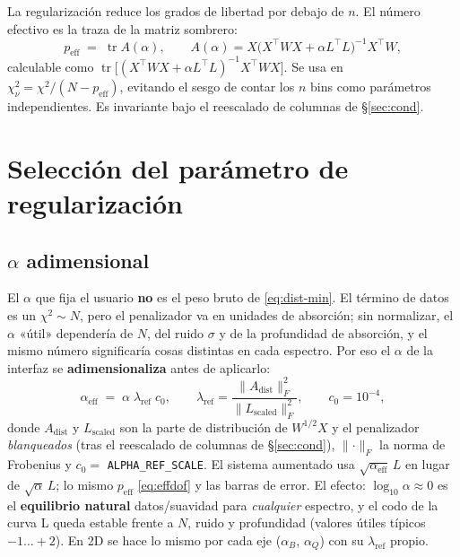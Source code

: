 \documentclass[11pt,a4paper]{article}
\newcommand{\code}[1]{\texttt{\small #1}}
\DeclareMathOperator{\tr}{tr}
\begin{document}
La regularización reduce los grados de libertad por debajo de $n$. El número
efectivo es la traza de la matriz sombrero:
\begin{equation}
  p_{\text{eff}} \;=\; \tr A(\alpha),\qquad
  A(\alpha)=X\bigl(X^\top W X+\alpha L^\top L\bigr)^{-1}X^\top W,
  \label{eq:effdof}
\end{equation}
calculable como $\tr\!\bigl[(X^\top WX+\alpha L^\top L)^{-1}X^\top WX\bigr]$. Se usa
en $\chi^2_\nu=\chi^2/(N-p_{\text{eff}})$, evitando el sesgo de contar los $n$
bins como parámetros independientes. Es invariante bajo el reescalado de
columnas de \S\ref{sec:cond}.

\section{Selección del parámetro de regularización}\label{sec:alpha}

\subsection{$\alpha$ adimensional}\label{sec:alpha-dimless}
El $\alpha$ que fija el usuario \textbf{no} es el peso bruto de \eqref{eq:dist-min}.
El término de datos es un $\chi^2\sim N$, pero el penalizador va en unidades de
absorción; sin normalizar, el $\alpha$ «útil» dependería de $N$, del ruido
$\sigma$ y de la profundidad de absorción, y el mismo número significaría cosas
distintas en cada espectro. Por eso el $\alpha$ de la interfaz se
\textbf{adimensionaliza} antes de aplicarlo:
\begin{equation}
  \alpha_{\text{eff}} \;=\; \alpha\;\lambda_{\text{ref}}\;c_0,
  \qquad
  \lambda_{\text{ref}} = \frac{\lVert A_{\text{dist}}\rVert_F^2}{\lVert L_{\text{scaled}}\rVert_F^2},
  \qquad c_0 = 10^{-4},
\end{equation}
donde $A_{\text{dist}}$ y $L_{\text{scaled}}$ son la parte de distribución de
$W^{1/2}X$ y el penalizador \emph{blanqueados} (tras el reescalado de columnas de
\S\ref{sec:cond}), $\lVert\cdot\rVert_F$ la norma de Frobenius y $c_0=$
\code{ALPHA\_REF\_SCALE}. El sistema aumentado usa $\sqrt{\alpha_{\text{eff}}}\,L$
en lugar de $\sqrt\alpha\,L$; lo mismo $p_{\text{eff}}$ \eqref{eq:effdof} y las
barras de error. El efecto: $\log_{10}\alpha\approx 0$ es el \textbf{equilibrio
natural} datos/suavidad para \emph{cualquier} espectro, y el codo de la curva L
queda estable frente a $N$, ruido y profundidad (valores útiles típicos
$-1\ldots+2$). En 2D se hace lo mismo por cada eje ($\alpha_B$, $\alpha_Q$) con su
$\lambda_{\text{ref}}$ propio.
\end{document}
